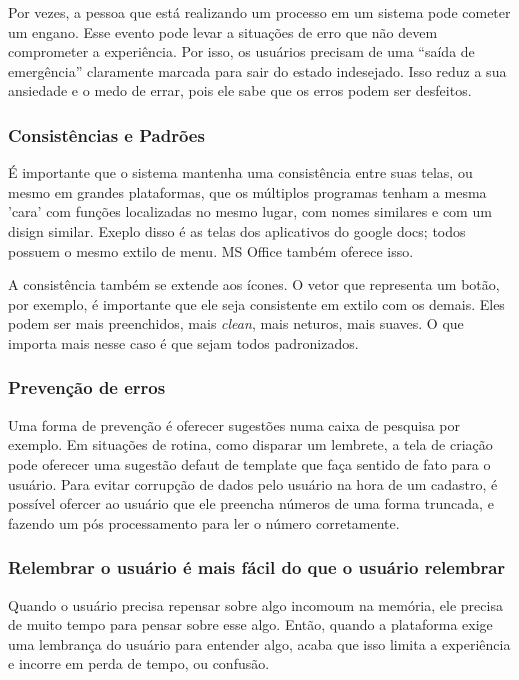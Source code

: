 Por vezes, a pessoa que está realizando um processo em um sistema pode cometer um engano. Esse evento pode levar a situações de erro que não devem comprometer a experiência. Por isso, os usuários precisam de uma “saída de emergência” claramente marcada para sair do estado indesejado. Isso reduz a sua ansiedade e o medo de errar, pois ele sabe que os erros podem ser desfeitos. \cite{BarbosaEtAl2021InteracaoHumanoComputadorExperiencia}

\subsubsection{Consistências e Padrões}

É importante que o sistema mantenha uma consistência entre suas telas, ou mesmo em grandes plataformas, que os múltiplos programas tenham a mesma 'cara' com funções localizadas no mesmo lugar, com nomes similares e com um disign similar. Exeplo disso é as telas dos aplicativos do google docs; todos possuem o mesmo extilo de menu. MS Office também oferece isso.

A consistência também se extende aos ícones. O vetor que representa um botão, por exemplo, é importante que ele seja consistente em extilo com os demais. Eles podem ser mais preenchidos, mais \textit{clean}, mais neturos, mais suaves. O que importa mais nesse caso é que sejam todos padronizados. \cite{site:nielsenIcon}


\subsubsection{Prevenção de erros}

Uma forma de prevenção é oferecer sugestões numa caixa de pesquisa por exemplo. Em situações de rotina, como disparar um lembrete, a tela de criação pode oferecer uma sugestão defaut de template que faça sentido de fato para o usuário. Para evitar corrupção de dados pelo usuário na hora de um cadastro, é possível ofercer ao usuário que ele preencha números de uma forma truncada, e fazendo um pós processamento para ler o número corretamente.

\subsubsection{Relembrar o usuário é mais fácil do que o usuário relembrar}

Quando o usuário precisa repensar sobre algo incomoum na memória, ele precisa de muito tempo para pensar sobre esse algo. Então, quando a plataforma exige uma lembrança do usuário para entender algo, acaba que isso limita a experiência e incorre em perda de tempo, ou confusão.

